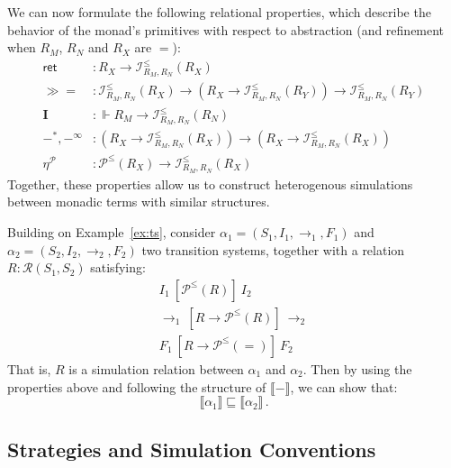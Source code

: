 \documentclass[acmsmall,timestamp,review,anonymous]{acmart}
\newcommand{\kw}[1]{\ensuremath{ \mathsf{#1} }}
\newcommand{\ifr}[1]{\ [{#1}]\ }
\newcommand{\bind}{\gg\!\!=}
\begin{document}
We can now formulate the following relational properties,
which describe the behavior of the monad's primitives
with respect to abstraction
(and refinement when $R_M$, $R_N$ and $R_X$ are $=$):
\begin{align*}
  \kw{ret} &:
    R_X \rightarrow \mathcal{I}^\le_{R_M,R_N}(R_X) \\
  \bind &:
    \mathcal{I}^\le_{R_M,R_N}(R_X) \rightarrow
    (R_X \rightarrow
     \mathcal{I}^\le_{R_M,R_N}(R_Y)) \rightarrow
    \mathcal{I}^\le_{R_M,R_N}(R_Y) \\
  \mathbf{I} &:
    {}\Vdash R_M \rightarrow
    \mathcal{I}^\le_{R_M,R_N}(R_N) \\
  -^*,
  -^\infty &:
    (R_X \rightarrow \mathcal{I}^\le_{R_M,R_N}(R_X)) \rightarrow
    (R_X \rightarrow \mathcal{I}^\le_{R_M,R_N}(R_X)) \\
  \eta^\mathcal{P} &:
    \mathcal{P}^\le(R_X) \rightarrow
    \mathcal{I}^\le_{R_M,R_N}(R_X)
\end{align*}
Together,
these properties allow us to construct
heterogenous simulations
between monadic terms with similar structures.

\begin{example} \label{ex:sim}
Building on Example~\ref{ex:ts},
consider
$\alpha_1 = (S_1, I_1, {\rightarrow}_1, F_1)$ and
$\alpha_2 = (S_2, I_2, {\rightarrow}_2, F_2)$
two transition systems,
together with a relation
$R : \mathcal{R}(S_1, S_2)$
satisfying:
\begin{gather*}
  I_1 \ifr{\mathcal{P}^\le(R)} I_2 \\
  {\rightarrow}_1 \ifr{R \rightarrow \mathcal{P}^\le(R)} {\rightarrow}_2 \\
  F_1 \ifr{R \rightarrow \mathcal{P}^\le(=)} F_2
\end{gather*}
That is, $R$ is a simulation relation between $\alpha_1$ and $\alpha_2$.
Then by using the properties above and
following the structure of $\llbracket - \rrbracket$,
we can show that:
\[
    \llbracket \alpha_1 \rrbracket \sqsubseteq
    \llbracket \alpha_2 \rrbracket \,.
\]
\end{example}


\subsection{Strategies and Simulation Conventions} \label{sec:monad:games} %
\end{document}
